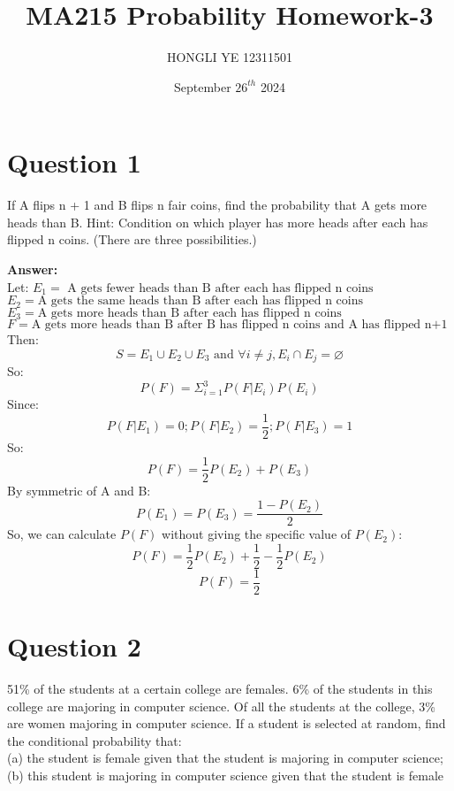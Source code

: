 \documentclass[hidelinks]{article}
\title{\textbf{MA215 Probability Homework-3}}
\author{HONGLI YE 12311501}
\date{September $26^{th}$ 2024}
\begin{document}
\hypersetup{bookmarksnumbered=true,}
\pagecolor{white}
\color{black}
\maketitle

\begin{Large}
\tableofcontents
\end{Large}%
\pagebreak

\section{Question 1}
If A flips n + 1 and B flips n fair coins, find the probability that A gets more heads than B. Hint: Condition on which player has more heads after each has flipped n coins. (There are three possibilities.)

\textbf{ \large Answer:}\\
Let: 
$E_1 = \text{ A gets fewer heads than B after each has flipped n coins}$\\
$ E_2 = \text{A gets the same heads than B after each has flipped n coins}$\\
$ E_3 = \text{A gets more heads than B after each has flipped n coins}$\\
$ F = \text{A gets more heads than B after B has flipped n coins and A has flipped n+1 coins}$\\
Then:
$$ S = E_1 \cup E_2 \cup  E_3 \text{ and } \forall i \neq j, E_i \cap E_j =  \varnothing $$
So:
$$ P(F) = \Sigma^3_{i=1}P(F|E_i)P(E_i) $$
Since:
$$ P(F|E_1) = 0; P(F|E_2) = \frac{1}{2}; P(F|E_3) = 1$$
So:
$$ P(F) = \frac{1}{2}P(E_2) + P(E_3)$$
By symmetric of A and B:
$$ P(E_1) = P(E_3) = \frac{1 - P(E_2)}{2}$$
So, we can calculate $P(F)$ without giving the specific value of $P(E_2)$:
$$ P(F) = \frac{1}{2}P(E_2) + \frac{1}{2} - \frac{1}{2}P(E_2) $$
$$ P(F) = \frac{1}{2}$$

\section{Question 2}
51\% of the students at a certain college are females. 6\% of the students in this college are majoring in computer science. Of all the students at the college, 3\% are women majoring in computer science. If a student is selected at random, find the conditional probability that:\\
(a) the student is female given that the student is majoring in computer science;\\
(b) this student is majoring in computer science given that the student is female
\end{document}
